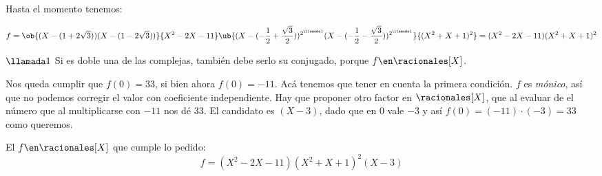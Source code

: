 Hasta el momento tenemos:\par
$$
f =
\ob{(X - (1+2\sqrt{3})) (X - (1-2\sqrt{3}))}{X^2 - 2X - 11}
\ub{(X - (-\frac{1}{2} + \frac{\sqrt{3}}{2}))^{2^{\llamada1}}
(X - (-\frac{1}{2} - \frac{\sqrt{3}}{2}))^{2^{\llamada1}}}{(X^2 + X + 1)^2} =
(X^2 - 2X - 11)(X^2 + X + 1)^2
$$

$\llamada1$ Si es doble una de las complejas, también debe serlo su conjugado, porque
$f\en \racionales[X]$.\bigskip

Nos queda cumplir que $f(0) = 33$, si bien ahora $f(0) = -11$. Acá tenemos que tener en cuenta
la primera condición. $f$ es \textit{mónico}, así que no podemos corregir el valor con coeficiente independiente.
Hay que proponer otro factor en $\racionales[X]$, que al evaluar de el número que al multiplicarse con $-11$ nos dé
33. El candidato es $(X-3)$, dado que en 0 vale $-3$ y así $f(0) = (-11) \cdot (-3) = 33$ como queremos.\par

El $f \en\racionales[X]$ que cumple lo pedido:
$$
\boxed{f = (X^2 - 2X - 11)(X^2 + X + 1)^2(X-3)}
$$



